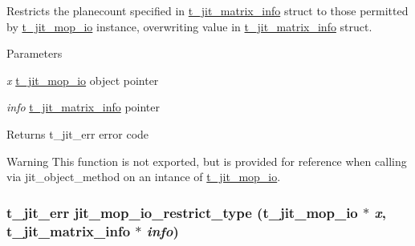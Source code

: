 Restricts the planecount specified in \hyperlink{structt__jit__matrix__info}{t\_\-jit\_\-matrix\_\-info} struct to those permitted by \hyperlink{structt__jit__mop__io}{t\_\-jit\_\-mop\_\-io} instance, overwriting value in \hyperlink{structt__jit__matrix__info}{t\_\-jit\_\-matrix\_\-info} struct. 
\begin{DoxyParams}{Parameters}
\item[{\em x}]\hyperlink{structt__jit__mop__io}{t\_\-jit\_\-mop\_\-io} object pointer \item[{\em info}]\hyperlink{structt__jit__matrix__info}{t\_\-jit\_\-matrix\_\-info} pointer\end{DoxyParams}
\begin{DoxyReturn}{Returns}
t\_\-jit\_\-err error code
\end{DoxyReturn}
\begin{DoxyWarning}{Warning}
This function is not exported, but is provided for reference when calling via jit\_\-object\_\-method on an intance of \hyperlink{structt__jit__mop__io}{t\_\-jit\_\-mop\_\-io}. 
\end{DoxyWarning}
\hypertarget{group__mopmod_ga9f85cf8513ff75fabea615619686e84f}{
\subsubsection[{jit\_\-mop\_\-io\_\-restrict\_\-type}]{\setlength{\rightskip}{0pt plus 5cm}t\_\-jit\_\-err jit\_\-mop\_\-io\_\-restrict\_\-type ({\bf t\_\-jit\_\-mop\_\-io} $\ast$ {\em x}, \/  {\bf t\_\-jit\_\-matrix\_\-info} $\ast$ {\em info})}}
\label{group__mopmod_ga9f85cf8513ff75fabea615619686e84f}



